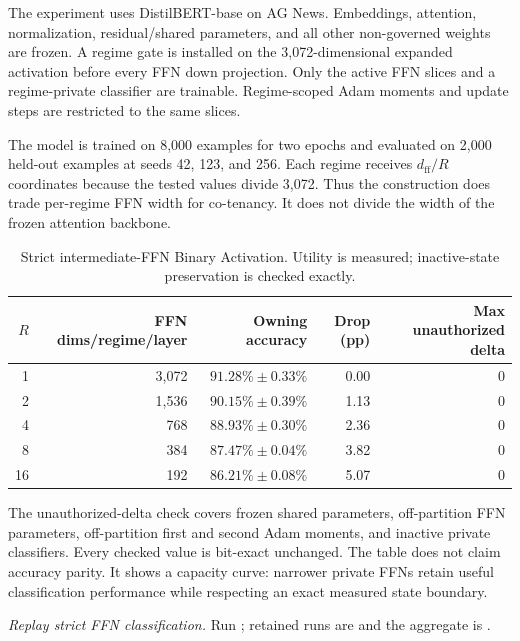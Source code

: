 \documentclass[11pt]{article}
\begin{document}
The experiment uses DistilBERT-base on AG News. Embeddings, attention,
normalization, residual/shared parameters, and all other non-governed weights
are frozen. A regime gate is installed on the 3,072-dimensional expanded
activation before every FFN down projection. Only the active FFN slices and a
regime-private classifier are trainable. Regime-scoped Adam moments and update
steps are restricted to the same slices.

The model is trained on 8,000 examples for two epochs and evaluated on 2,000
held-out examples at seeds 42, 123, and 256. Each regime receives
$d_{\mathrm{ff}}/R$ coordinates because the tested values divide 3,072. Thus
the construction does trade per-regime FFN width for co-tenancy. It does not
divide the width of the frozen attention backbone.

\begin{table}[ht]
\centering
\caption{Strict intermediate-FFN Binary Activation. Utility is measured;
inactive-state preservation is checked exactly.}
\label{tab:strict}
\small
\begin{tabular}{@{}rrrrr@{}}
\toprule
$R$ & FFN dims/regime/layer & Owning accuracy & Drop (pp) & Max unauthorized delta \\
\midrule
1  & 3,072 & $91.28\%\pm0.33\%$ & 0.00 & 0 \\
2  & 1,536 & $90.15\%\pm0.39\%$ & 1.13 & 0 \\
4  &   768 & $88.93\%\pm0.30\%$ & 2.36 & 0 \\
8  &   384 & $87.47\%\pm0.04\%$ & 3.82 & 0 \\
16 &   192 & $86.21\%\pm0.08\%$ & 5.07 & 0 \\
\bottomrule
\end{tabular}
\end{table}

The unauthorized-delta check covers frozen shared parameters, off-partition
FFN parameters, off-partition first and second Adam moments, and inactive
private classifiers. Every checked value is bit-exact unchanged. The table does
not claim accuracy parity. It shows a capacity curve: narrower private FFNs
retain useful classification performance while respecting an exact measured
state boundary.

\begin{sloppypar}
\noindent\textit{Replay strict FFN classification.} Run
; retained runs are
 and the aggregate is
.
\end{sloppypar}
\end{document}
